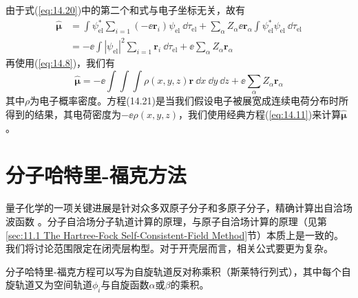     由于式(\ref{eq:14.20})中的第二个和式与电子坐标无关，故有
    \begin{equation*}
        \begin{aligned}
            \hat{\symbf{\mu}} &= \int \psi_{\text{el}}^* \sum_{i=1} \left(-\ee \mathbf{r}_i\right) \psi_{\text{el}}\:\dd \tau_{\text{el}} + \sum_{\alpha} Z_{\alpha} \ee \mathbf{r}_{\alpha} \int \psi_{\text{el}}^* \psi_{\text{el}} \:\dd \tau_{\text{el}} \\
            &= -\ee \int \left|\psi_{\text{el}}\right|^2 \sum_{i=1} \mathbf{r}_i \:\dd \tau_{\text{el}} + \ee \sum_{\alpha} Z_{\alpha} \mathbf{r}_{\alpha}
        \end{aligned}
    \end{equation*}
    再使用(\ref{eq:14.8})，我们有
    \begin{equation}
        \hat{\symbf{\mu}} = -\ee \int \int \int \rho\left(x,y,z\right) \mathbf{r} \:\dd x \:\dd y \:\dd z + \ee \sum_{\alpha} Z_{\alpha} \mathbf{r}_{\alpha}
        \label{eq:14.21}
    \end{equation}
    其中$\rho$为电子概率密度。方程(14.21)是当我们假设电子被展宽成连续电荷分布时所得到的结果，其电荷密度为$-\ee \rho\left(x,y,z\right)$，我们使用经典方程(\ref{eq:14.11})来计算$\hat{\symbf{\mu}}$。

\section{分子哈特里-福克方法}
\label{sec:14.3 The Hartree-Fock Method for Molecules}

    量子化学的一项关键进展是针对众多双原子分子和多原子分子，精确计算出自洽场波函数 。分子自洽场分子轨道计算的原理，与原子自洽场计算的原理（见第\ref{sec:11.1 The Hartree-Fock Self-Consistent-Field Method}节）本质上是一致的。我们将讨论范围限定在闭壳层构型。对于开壳层而言，相关公式要更为复杂。

    分子哈特里-福克方程可以写为自旋轨道反对称乘积（斯莱特行列式），其中每个自旋轨道又为空间轨道$\phi_i$与自旋函数$\alpha$或$\beta$的乘积。

